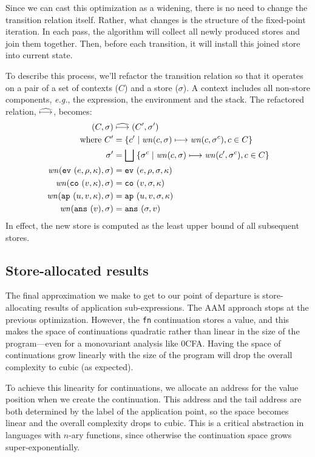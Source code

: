 \documentclass[preprint,onecolumn,9pt]{sigplanconf} %
\begin{document}
Since we can cast this optimization as a widening, there is no need to change
the transition relation itself.
%
Rather, what changes is the structure of the fixed-point iteration.
%
In each pass, the algorithm will collect all newly produced stores and join
them together.
%
Then, before each transition, it will install this joined store into current
state.

To describe this process, we'll refactor the transition relation so that it operates on
a pair of a set of contexts ($C$) and a store ($\sigma$).
%
A context includes all non-store components, \emph{e.g.}, the expression, the environment and the stack.
%
The refactored relation, $\widehat{\longmapsto}$, becomes:
%
\begin{align*}
(C, \sigma) &\mathrel{\widehat{\longmapsto}} (C', \sigma') \\
\mbox{where } C' &= \{c' \mid \mathit{wn}(c, \sigma) \mathrel{\longmapsto} \mathit{wn}(c, \sigma^c), c \in C\} \\
              \sigma' &= \bigsqcup\; \{\sigma^c \mid \mathit{wn}(c,\sigma)\mathrel{\longmapsto} \mathit{wn}(c', \sigma^c), c \in C\} \\
\mathit{wn}({\tt ev{\ }}({e, \rho, \kappa}), \sigma) &= {\tt ev{\ }}({e, \rho, \sigma, \kappa}) \\
\mathit{wn}({\tt co{\ }}({v, \kappa}), \sigma) &= {\tt co{\ }}({v, \sigma, \kappa}) \\
\mathit{wn}({\tt ap{\ }}({u, v, \kappa}), \sigma) &= {\tt ap{\ }}({u, v, \sigma, \kappa}) \\
\mathit{wn}({\tt ans{\ }}({v}), \sigma) &= {\tt ans{\ }}({\sigma, v})
\end{align*}
%
In effect, the new store is computed as the least upper bound of all subsequent stores.


\subsection{Store-allocated results}
\label{sec:baselineeval}

The final approximation we make to get to our point of departure is
store-allocating results of application sub-expressions. 
The AAM approach stops at the previous optimization. 
However, the {\tt fn} continuation stores a value, and this makes the space of
continuations quadratic rather than linear in the size of the program---even for a monovariant analysis like 0CFA.
Having the space of continuations grow linearly with the size of the program 
will drop the overall complexity to cubic (as expected).

To achieve this linearity for continuations, we allocate an address
for the value position when we create the continuation.  This address
and the tail address are both determined by the label of the
application point, so the space becomes linear and the overall
complexity drops to cubic.  This is a critical abstraction in
languages with $n$-ary functions, since otherwise the continuation
space grows super-exponentially.
\end{document}
